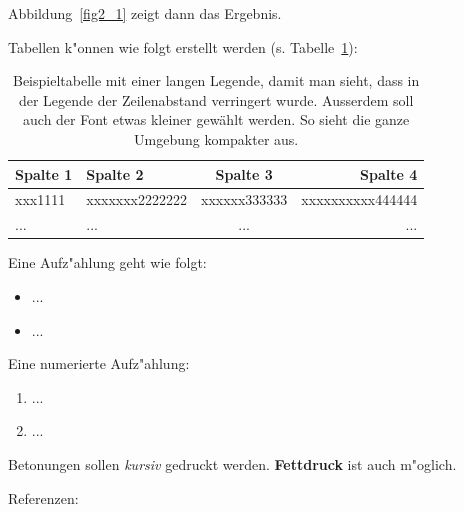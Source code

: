 Abbildung~\ref{fig2_1} zeigt dann das Ergebnis.

Tabellen k"onnen wie folgt erstellt werden (s. Tabelle~\ref{tabelle-1}):

{
\renewcommand{\baselinestretch}{0.9} 
\normalsize
\begin{table}[htb]
\begin{tabular}{|p{2.7cm}||l|c|r|}
\hline
    \textbf{Spalte 1} 
  & \textbf{Spalte 2} 
  & \textbf{Spalte 3} 
  & \textbf{Spalte 4} \\
  \hline\hline
  xxx1111
  & xxxxxxx2222222
  & xxxxxx333333 
  & xxxxxxxxxx444444 \\
  \hline
    ...
  & ...
  & ...
  & ...\\
  \hline
\end{tabular}
  \caption[Diese Kurzcaption ist fuer das Tabellenverzeichnis]{Beispieltabelle mit einer langen Legende, damit man sieht, dass in der Legende der Zeilenabstand verringert wurde. Ausserdem soll auch der Font etwas kleiner gew\"ahlt werden. So sieht die ganze Umgebung kompakter aus.}
  \label{tabelle-1}
\end{table}
}

\noindent
Eine Aufz"ahlung geht wie folgt:
\begin{itemize}
\item ...
\item ...
\end{itemize}
Eine numerierte Aufz"ahlung:
\begin{enumerate}
\item ...
\item ...
\end{enumerate}

Betonungen sollen \emph{kursiv} gedruckt werden. 
\textbf{Fettdruck} ist auch m"oglich.

Referenzen: \cite{LReact}
